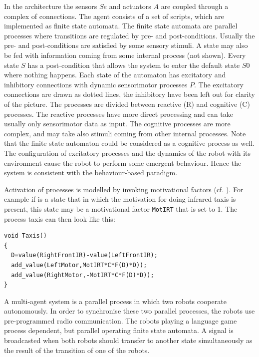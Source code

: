 In the architecture the sensors $Se$ and actuators $A$ are coupled through a complex of connections. The agent consists of a set of scripts, which are implemented as finite state automata. The finite state automata are parallel processes where transitions are regulated by pre- and post-conditions. Usually the pre- and post-conditions are satisfied by some sensory stimuli. A state may also be fed with information coming from some internal process (not shown). Every state $S$ has a post-condition that allows the system to enter the default state $S0$ where nothing happens. Each state of the automaton has excitatory and inhibitory connections with dynamic sensorimotor processes $P$. The excitatory connections are drawn as dotted lines, the inhibitory have been left out for clarity of the picture. The processes are divided between reactive {\scshape (R)} and cognitive {\scshape (C)} processes. The reactive processes have more direct processing and can take usually only sensorimotor data as input. The cognitive processes are more complex, and may take also stimuli coming from other internal processes. Note that the finite state automaton could be considered as a cognitive process as well. The configuration of excitatory processes and the dynamics of the robot with its environment cause the robot to perform some emergent behaviour. Hence the system is consistent with the behaviour-based paradigm.

Activation of processes is modelled by invoking motivational factors (cf. \citealt{steels:1996d,jaeger:1997}). For example if is a state that in which the motivation for doing infrared taxis is present, this state may be a motivational factor \texttt{MotIRT} that is set to 1. The process taxis can then look like this:

\begin{lstlisting}
void Taxis()
{
  D=value(RightFrontIR)-value(LeftFrontIR);
  add_value(LeftMotor,MotIRT*C*F(D)*D));
  add_value(RightMotor,-MotIRT*C*F(D)*D));
}
\end{lstlisting}

A multi-agent system is a parallel process in which two robots cooperate autonomously. In order to synchronise these two parallel processes, the robots use pre-programmed radio communication. The robots playing a language game process dependent, but parallel operating finite state automata. A signal is broadcasted when both robots should transfer to another state simultaneously as the result of the transition of one of the robots.

